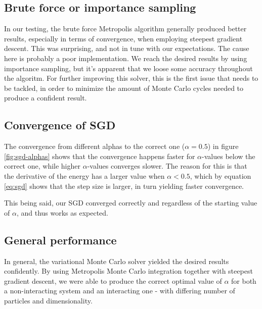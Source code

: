 \documentclass[
]{article}
\begin{document}
\hypertarget{brute-force-or-importance-sampling}{%
\subsection*{Brute force or importance
sampling}\label{brute-force-or-importance-sampling}}

In our testing, the brute force Metropolis algorithm generally produced
better results, especially in terms of convergence, when employing
steepest gradient descent. This was surprising, and not in tune with our
expectations. The cause here is probably a poor implementation. We reach
the desired results by using importance sampling, but it's apparent that
we loose some accuracy throughout the algoritm. For further improving
this solver, this is the first issue that needs to be tackled, in order
to minimize the amount of Monte Carlo cycles needed to produce a
confident result.

\hypertarget{convergence-of-sgd}{%
\subsection*{Convergence of SGD}\label{convergence-of-sgd}}

The convergence from different alphas to the correct one
(\(\alpha = 0.5\)) in figure \ref{fig:sgd-alphas} shows that the
convergence happens faster for \(\alpha\)-values below the correct one,
while higher \(\alpha\)-values converges slower. The reason for this is
that the derivative of the energy has a larger value when
\(\alpha < 0.5\), which by equation \eqref{eq:sgd} shows that the step
size is larger, in turn yielding faster convergence.

This being said, our SGD converged correctly and regardless of the
starting value of \(\alpha\), and thus works as expected.

\hypertarget{general-performance}{%
\subsection*{General performance}\label{general-performance}}

In general, the variational Monte Carlo solver yielded the desired
results confidently. By using Metropolis Monte Carlo integration
together with steepest gradient descent, we were able to produce the
correct optimal value of \(\alpha\) for both a non-interacting system
and an interacting one - with differing number of particles and
dimensionality.
\end{document}
